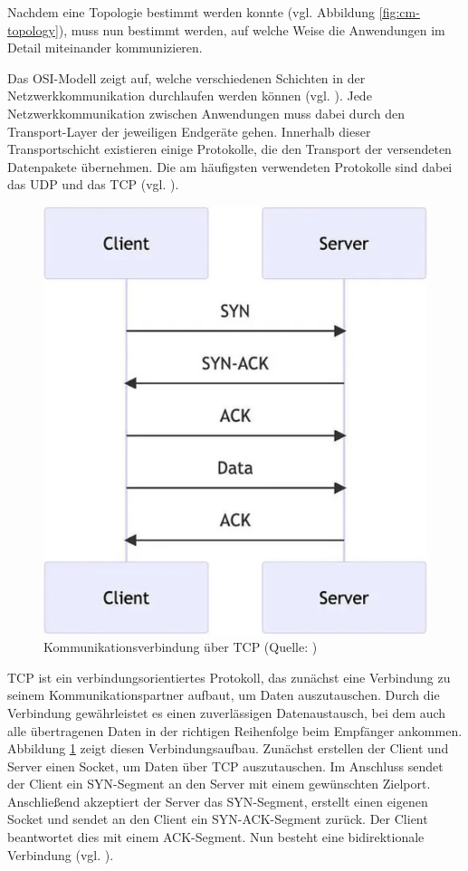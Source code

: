 Nachdem eine Topologie bestimmt werden konnte (vgl. Abbildung \ref{fig:cm-topology}), muss nun bestimmt werden, auf welche Weise die Anwendungen im Detail miteinander kommunizieren. 

Das \ac{OSI}-Modell zeigt auf, welche verschiedenen Schichten in der Netzwerkkommunikation durchlaufen werden können (vgl. \cite{noauthor_osi-modell_nodate}). Jede Netzwerkkommunikation zwischen Anwendungen muss dabei durch den Transport-Layer der jeweiligen Endgeräte gehen. Innerhalb dieser Transportschicht existieren einige Protokolle, die den Transport der versendeten Datenpakete übernehmen. Die am häufigsten verwendeten Protokolle sind dabei das \ac{UDP} und das \ac{TCP} (vgl. \cite{noauthor_transport_nodate}). 

\begin{figure}[ht]
\centering
\includegraphics[width=0.5\linewidth]{content/pictures/TCP-Network.png}
\caption{Kommunikationsverbindung über TCP (Quelle: \cite{mygames_unity_2024})}
\label{fig:tcp}
\end{figure}

\ac{TCP} ist ein verbindungsorientiertes Protokoll, das zunächst eine Verbindung zu seinem Kommunikationspartner aufbaut, um Daten auszutauschen. Durch die Verbindung gewährleistet es einen zuverlässigen Datenaustausch, bei dem auch alle übertragenen Daten in der richtigen Reihenfolge beim Empfänger ankommen. Abbildung \ref{fig:tcp} zeigt diesen Verbindungsaufbau.
Zunächst erstellen der Client und Server einen Socket, um Daten über \ac{TCP} auszutauschen. Im Anschluss sendet der Client ein \ac{SYN}-Segment an den Server mit einem gewünschten Zielport. Anschließend akzeptiert der Server das \ac{SYN}-Segment, erstellt einen eigenen Socket und sendet an den Client ein \ac{SYN}-\ac{ACK}-Segment zurück. Der Client beantwortet dies mit einem \ac{ACK}-Segment. Nun besteht eine bidirektionale Verbindung  (vgl. \cite{mygames_unity_2024}).

